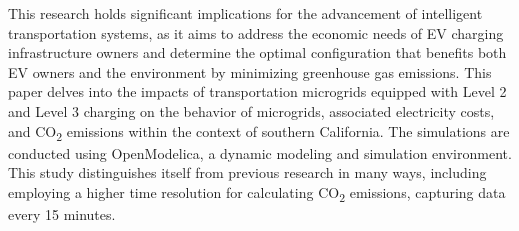 \documentclass[conference]{IEEEtran}
\begin{document}
		This research holds significant implications for the advancement of intelligent transportation systems, as it aims to address the economic needs of EV charging infrastructure owners and determine the optimal configuration that benefits both EV owners and the environment by minimizing greenhouse gas emissions. This paper delves into the impacts of transportation microgrids equipped with Level 2 and Level 3 charging on the behavior of microgrids, associated electricity costs, and CO\textsubscript{2} emissions within the context of southern California. The simulations are conducted using OpenModelica, a dynamic modeling and simulation environment. This study distinguishes itself from previous research in many ways, including employing a higher time resolution for calculating CO\textsubscript{2} emissions, capturing data every 15 minutes.
\end{document}
